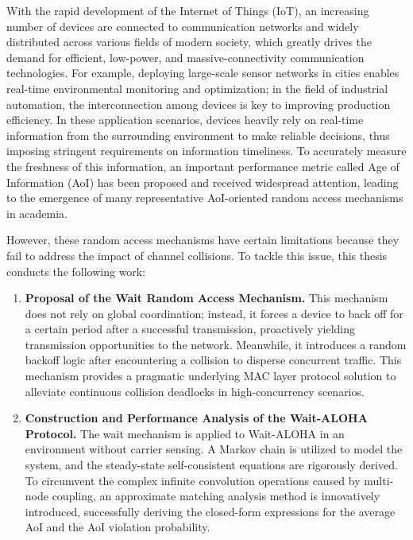 \begin{abstractEN}
\setlength{\baselineskip}{23pt} %

With the rapid development of the Internet of Things (IoT), an increasing number of devices are connected to communication networks and widely distributed across various fields of modern society, which greatly drives the demand for efficient, low-power, and massive-connectivity communication technologies. For example, deploying large-scale sensor networks in cities enables real-time environmental monitoring and optimization; in the field of industrial automation, the interconnection among devices is key to improving production efficiency. In these application scenarios, devices heavily rely on real-time information from the surrounding environment to make reliable decisions, thus imposing stringent requirements on information timeliness. To accurately measure the freshness of this information, an important performance metric called Age of Information (AoI) has been proposed and received widespread attention, leading to the emergence of many representative AoI-oriented random access mechanisms in academia.

However, these random access mechanisms have certain limitations because they fail to address the impact of channel collisions. To tackle this issue, this thesis conducts the following work:

\begin{enumerate} [wide]
\item \textbf{Proposal of the Wait Random Access Mechanism.} This mechanism does not rely on global coordination; instead, it forces a device to back off for a certain period after a successful transmission, proactively yielding transmission opportunities to the network. Meanwhile, it introduces a random backoff logic after encountering a collision to disperse concurrent traffic. This mechanism provides a pragmatic underlying MAC layer protocol solution to alleviate continuous collision deadlocks in high-concurrency scenarios.

\item \textbf{Construction and Performance Analysis of the Wait-ALOHA Protocol.} The wait mechanism is applied to Wait-ALOHA in an environment without carrier sensing. A Markov chain is utilized to model the system, and the steady-state self-consistent equations are rigorously derived. To circumvent the complex infinite convolution operations caused by multi-node coupling, an approximate matching analysis method is innovatively introduced, successfully deriving the closed-form expressions for the average AoI and the AoI violation probability.


\end{enumerate}
\end{abstractEN}
